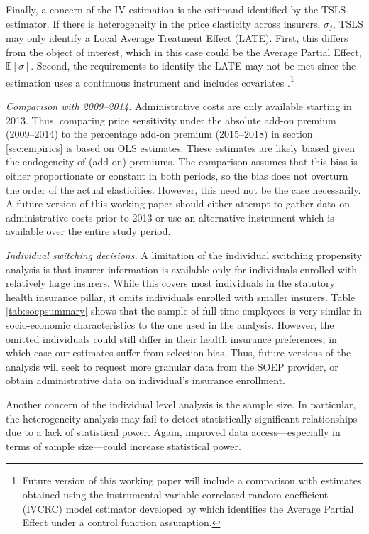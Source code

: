 \documentclass[a4paper, 11pt, english]{article}
\begin{document}
Finally, a concern of the IV estimation is the estimand identified by the TSLS estimator. If there is heterogeneity in the price elasticity across insurers, $\sigma_j$, TSLS may only identify a Local Average Treatment Effect (LATE). First, this differs from the object of interest, which in this case could be the Average Partial Effect, $\mathbb{E}[\sigma]$. Second, the requirements to identify the LATE may not be met since the estimation uses a continuous instrument and includes covariates \citep{blandhol2022tsls}.\footnote{Future version of this working paper will include a comparison with estimates obtained using the instrumental variable correlated random coefficient (IVCRC) model estimator developed by \citet{masten2016identification} which identifies the Average Partial Effect under a control function assumption.}

\textit{Comparison with 2009--2014.} Administrative costs are only available starting in 2013. Thus, comparing price sensitivity under the absolute add-on premium (2009--2014) to the percentage add-on premium (2015--2018) in section \ref{sec:empirics} is based on OLS estimates. These estimates are likely biased given the endogeneity of (add-on) premiums. The comparison assumes that this bias is either proportionate or constant in both periods, so the bias does not overturn the order of the actual elasticities. However, this need not be the case necessarily. A future version of this working paper should either attempt to gather data on administrative costs prior to 2013 or use an alternative instrument which is available over the entire study period.

\textit{Individual switching decisions.} A limitation of the individual switching propensity analysis is that insurer information is available only for individuals enrolled with relatively large insurers. While this covers most individuals in the statutory health insurance pillar, it omits individuals enrolled with smaller insurers. Table \ref{tab:soepsummary} shows that the sample of full-time employees is very similar in socio-economic characteristics to the one used in the analysis. However, the omitted individuals could still differ in their health insurance preferences, in which case our estimates suffer from selection bias. Thus, future versions of the analysis will seek to request more granular data from the SOEP provider, or obtain administrative data on individual's insurance enrollment.

Another concern of the individual level analysis is the sample size. In particular, the heterogeneity analysis may fail to detect statistically significant relationships due to a lack of statistical power. Again, improved data access---especially in terms of sample size---could increase statistical power.
\end{document}
